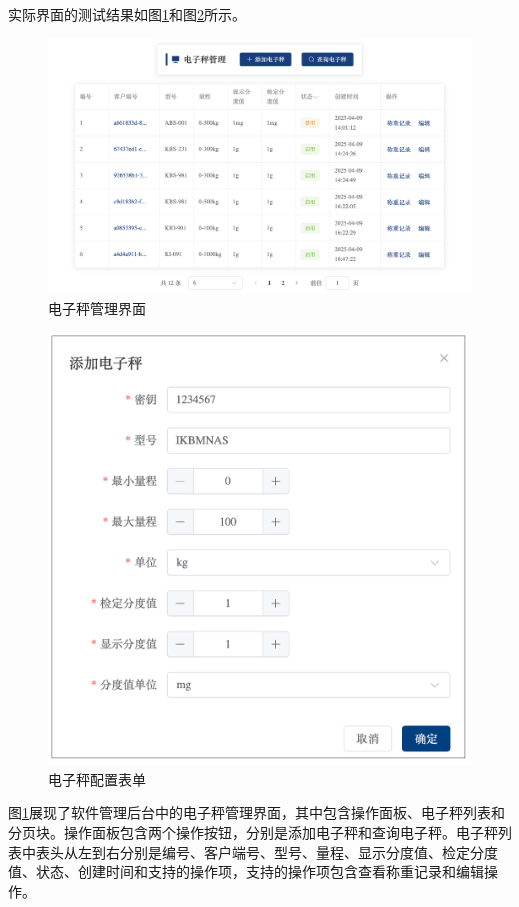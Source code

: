 实际界面的测试结果如图\ref{fig:web-scale}和图\ref{fig:form-new-scale}所示。

\begin{figure}[H]
    \centering
    \includegraphics[width=0.9\linewidth]{../result/web-scale.png}
    \caption{电子秤管理界面}
    \label{fig:web-scale}
\end{figure}

\begin{figure}[H]
    \centering
    \includegraphics[width=0.9\linewidth]{../result/form-new-scale.png}
    \caption{电子秤配置表单}
    \label{fig:form-new-scale}
\end{figure}

图\ref{fig:web-scale}展现了软件管理后台中的电子秤管理界面，其中包含操作面板、电子秤列表和分页块。操作面板包含两个操作按钮，分别是添加电子秤和查询电子秤。电子秤列表中表头从左到右分别是编号、客户端号、型号、量程、显示分度值、检定分度值、状态、创建时间和支持的操作项，支持的操作项包含查看称重记录和编辑操作。

